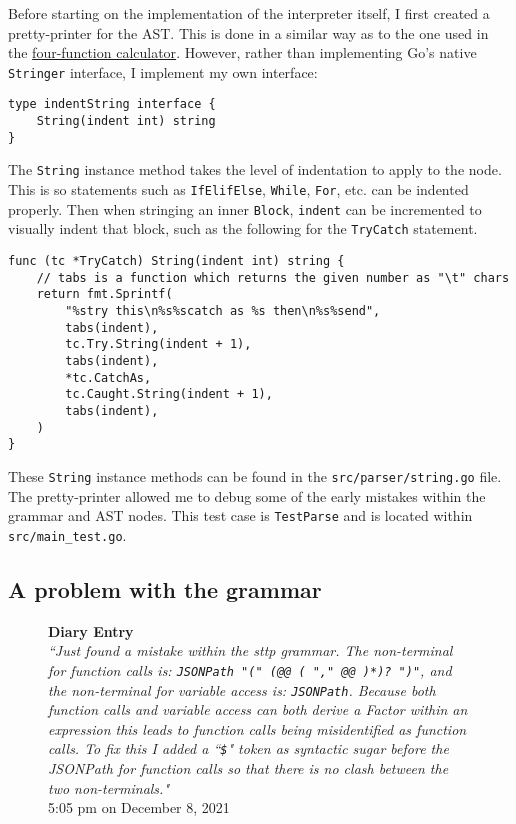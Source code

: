 Before starting on the implementation of the interpreter itself, I first created a pretty-printer for the AST. This is done in a similar way as to the one used in the \hyperref[sec:four-function-calc]{four-function calculator}. However, rather than implementing Go's native \verb|Stringer| interface, I implement my own interface:

\begin{verbatim}
type indentString interface {
    String(indent int) string
}
\end{verbatim}

The \verb|String| instance method takes the level of indentation to apply to the node. This is so statements such as \verb|IfElifElse|, \verb|While|, \verb|For|, etc. can be indented properly. Then when stringing an inner \verb|Block|, \verb|indent| can be incremented to visually indent that block, such as the following for the \verb|TryCatch| statement.

\begin{verbatim}
func (tc *TryCatch) String(indent int) string {
    // tabs is a function which returns the given number as "\t" chars
    return fmt.Sprintf(
        "%stry this\n%s%scatch as %s then\n%s%send",
        tabs(indent),
        tc.Try.String(indent + 1),
        tabs(indent),
        *tc.CatchAs,
        tc.Caught.String(indent + 1),
        tabs(indent),
    )
}
\end{verbatim}

These \verb|String| instance methods can be found in the \verb|src/parser/string.go| file. The pretty-printer allowed me to debug some of the early mistakes within the grammar and AST nodes. This test case is \verb|TestParse| and is located within \verb|src/main_test.go|.

\subsection{A problem with the grammar}

\begin{figure}[H]
    \begin{center}
        \textbf{Diary Entry}\\[0.5em]
        \cprotect\textit{``Just found a mistake within the sttp grammar. The non-terminal for function calls is: \verb|JSONPath "(" (@@ ( "," @@ )*)? ")"|, and the non-terminal for variable access is: \verb|JSONPath|. Because both function calls and variable access can both derive a Factor within an expression this leads to function calls being misidentified as function calls. To fix this I added a ``\verb|$|" token as syntactic sugar before the JSONPath for function calls so that there is no clash between the two non-terminals."}\\[0.5em]
        \tiny{5:05 pm on December 8, 2021}
    \end{center}
\end{figure}

